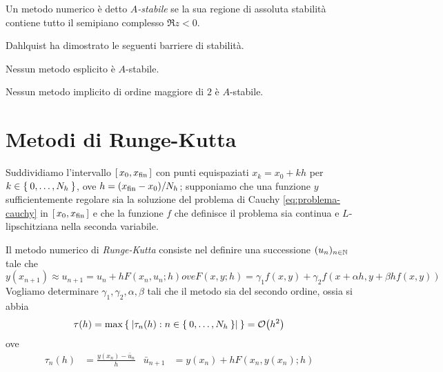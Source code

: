 	\begin{definizione}
		Un metodo numerico è detto \emph{\(A\)-stabile} se la sua regione di assoluta stabilità contiene tutto il semipiano complesso \(\Re z < 0\).
	\end{definizione}

	Dahlquist ha dimostrato le seguenti barriere di stabilità.
	
	\begin{teorema}
		Nessun metodo  esplicito è \(A\)-stabile.
	\end{teorema}

	\begin{teorema}
		Nessun metodo  implicito di ordine maggiore di \(2\) è \(A\)-stabile.
	\end{teorema}

\section{Metodi di Runge-Kutta}
	
	\noindent Suddividiamo l'intervallo \([\, x_0, x_{\textup{fin}} \,]\) con punti equispaziati \(x_k = x_0 + k h\) per \(k \in \Set{0, \dots, N_h}\), ove \(h = (x_{\textup{fin}} - x_0) / N_h\); supponiamo che una funzione \(y\) sufficientemente regolare sia la soluzione del problema di Cauchy \eqref{eq:problema-cauchy} in \([\, x_0, x_{\textup{fin}} \,]\) e che la funzione \(f\) che definisce il problema sia continua e \(L\)-lipschitziana nella seconda variabile.
	
	Il metodo numerico di \emph{Runge-Kutta} consiste nel definire una successione \((u_n)_{n \in \mathbb{N}}\) tale che
	\begin{subequations}
		\begin{equation}
			y (x_{n + 1}) \approx u_{n + 1} = u_n + h F (x_n, u_n; h)
		\end{equation}
		ove
		\begin{equation}
			F (x, y; h) = \gamma_1 f (x, y) + \gamma_2 f (x + \alpha h, y + \beta h f (x, y))
		\end{equation}
	\end{subequations}
	Vogliamo determinare \(\gamma_1, \gamma_2, \alpha, \beta\) tali che il metodo sia del secondo ordine, ossia si abbia
	\begin{equation*}
		\tau (h) = \max \Set{\abs{\tau_n (h) : n \in \Set{0, \dots, N_h}}} = \order{h^2}
	\end{equation*}
	ove
	\begin{align*}
		\tau_n (h) &= \frac{y (x_n) - \bar{u}_n}{h} &
		\bar{u}_{n + 1} &= y (x_n) + h F (x_n, y (x_n); h)
	\end{align*}


